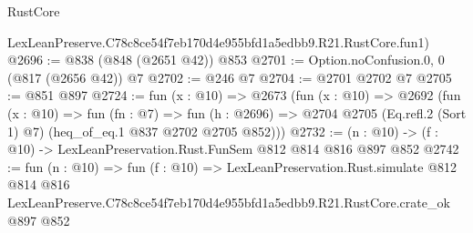 \begin{lexlean}{RustCore}
\begin{coremodule}
    LexLeanPreserve.C78c8ce54f7eb170d4e955bfd1a5edbb9.R21.RustCore.fun1)
@2696 := @838 (@848 (@2651 @42)) @853
@2701 := Option.noConfusion.{0, 0} (@817 (@2656 @42)) @7
@2702 := @246 @7
@2704 := @2701 @2702 @7
@2705 := @851 @897
@2724 := fun (x : @10) =>
  @2673
    (fun (x : @10) =>
    @2692
      (fun (x : @10) =>
      fun (fn : @7) =>
      fun (h : @2696) =>
      @2704 @2705 (Eq.refl.{2} (Sort 1) @7) (heq_of_eq.{1} @837 @2702 @2705 @852)))
@2732 := (n : @10) -> (f : @10) -> LexLeanPreservation.Rust.FunSem @812 @814 @816 @897 @852
@2742 := fun (n : @10) =>
  fun (f : @10) =>
  LexLeanPreservation.Rust.simulate
    @812
    @814
    @816
    LexLeanPreserve.C78c8ce54f7eb170d4e955bfd1a5edbb9.R21.RustCore.crate_ok
    @897
    @852
\end{coremodule}
\end{lexlean}
